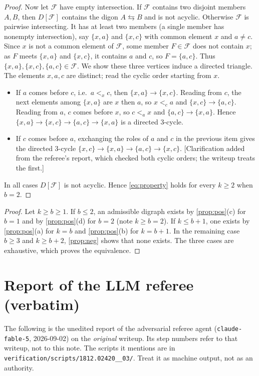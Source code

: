 \documentclass[11pt,a4paper]{article}
\theoremstyle{plain}
\theoremstyle{definition}
\theoremstyle{remark}
\newcommand{\cF}{\mathcal F}
\begin{document}
\begin{proof}
Now let $\cF$ have empty intersection. If $\cF$ contains two disjoint members $A,B$, then $D[\cF]$ contains the digon $A\leftrightarrows B$ and is not acyclic. Otherwise $\cF$ is pairwise intersecting. It has at least two members (a single member has nonempty intersection), say $\{x,a\}$ and $\{x,c\}$ with common element $x$ and $a\ne c$. Since $x$ is not a common element of $\cF$, some member $F\in\cF$ does not contain $x$; as $F$ meets $\{x,a\}$ and $\{x,c\}$, it contains $a$ and $c$, so $F=\{a,c\}$. Thus $\{x,a\},\{x,c\},\{a,c\}\in\cF$. We show these three vertices induce a directed triangle. The elements $x,a,c$ are distinct; read the cyclic order starting from $x$.
\begin{itemize}[nosep]
\item If $a$ comes before $c$, i.e.\ $a<_x c$, then $\{x,a\}\to\{x,c\}$. Reading from $c$, the next elements among $\{x,a\}$ are $x$ then $a$, so $x<_c a$ and $\{x,c\}\to\{a,c\}$. Reading from $a$, $c$ comes before $x$, so $c<_a x$ and $\{a,c\}\to\{x,a\}$. Hence $\{x,a\}\to\{x,c\}\to\{a,c\}\to\{x,a\}$ is a directed $3$-cycle.
\item If $c$ comes before $a$, exchanging the roles of $a$ and $c$ in the previous item gives the directed $3$-cycle $\{x,c\}\to\{x,a\}\to\{a,c\}\to\{x,c\}$. [Clarification added from the referee's report, which checked both cyclic orders; the writeup treats the first.]
\end{itemize}
In all cases $D[\cF]$ is not acyclic. Hence \eqref{eq:property} holds for every $k\ge2$ when $b=2$.
\end{proof}

\label{pf:main}
\thmmain*
\begin{proof}
Let $k\ge b\ge1$. If $b\le2$, an admissible digraph exists by \cref{prop:pos}(c) for $b=1$ and by \cref{prop:pos}(d) for $b=2$ (note $k\ge b=2$). If $k\le b+1$, one exists by \cref{prop:pos}(a) for $k=b$ and \cref{prop:pos}(b) for $k=b+1$. In the remaining case $b\ge3$ and $k\ge b+2$, \cref{prop:neg} shows that none exists. The three cases are exhaustive, which proves the equivalence.
\end{proof}

\section{Report of the LLM referee (verbatim)}\label{app:referee}

\begin{tcolorbox}[colback=gray!8,colframe=gray!50,boxrule=0.4pt,arc=2pt]
\small The following is the unedited report of the adversarial referee agent (\texttt{claude-fable-5}, 2026-09-02) on the \emph{original} writeup. Its step numbers refer to that writeup, not to this note. The scripts it mentions are in \texttt{verification/scripts/1812.02420\_\_03/}. Treat it as machine output, not as an authority.
\end{tcolorbox}
\end{document}
